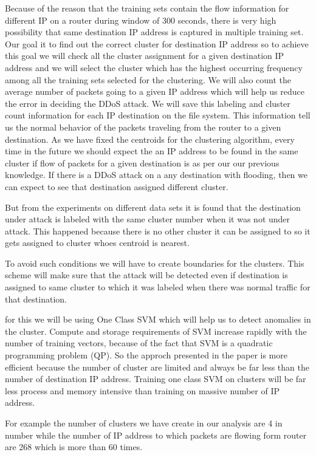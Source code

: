 \documentclass[10pt,oneside,a4paper]{article}
\begin{document}
Because of the reason that the training sets contain the flow information for different IP on a router during window of 300 seconds, there is very high possibility that same destination IP address is captured in multiple training set. Our goal it to find out the correct cluster for destination IP address so to achieve this goal we will check all the cluster assignment for a given destination IP address and we will select the cluster which has the highest occurring frequency among all the training sets selected for the clustering. We will also count the average number of packets going to a given IP address which will help us reduce the error in deciding the DDoS attack. We will save this labeling and cluster count information for each IP destination on the file system. This information tell us the normal behavior of the packets traveling from the router to a given destination. As we have fixed the centroids for the clustering algorithm, every time in the future we should expect the an IP address to be found in the same cluster if flow of packets for a given destination is as per our our previous knowledge. If there is a DDoS attack on a any destination with flooding, then we can expect to see that destination assigned different cluster.

But from the experiments on different data sets it is found that the destination under attack is labeled with the same cluster number when it was not under attack. This happened because there is no other cluster it can be assigned to so it gets assigned to cluster whoes centroid is nearest.

To avoid such conditions we will have to create boundaries for the clusters. This scheme will make sure that the attack will be detected even if destination is assigned to same cluster to which it was labeled when there was normal traffic for that destination.

for this we will be using One Class SVM which will help us to detect anomalies in the cluster. Compute and storage requirements of SVM increase rapidly with the number of training vectors, because of the fact that SVM is a quadratic programming problem (QP). So the approch presented in the paper is more efficient because the number of cluster are limited and always be far less than the number of destination IP address. Training one class SVM on clusters will be far less process and memory intensive than training on massive number of IP address.

For example the number of clusters we have create in our analysis are 4 in number while the number of IP address to which packets are flowing form router are 268 which is more than 60 times.
\end{document}
